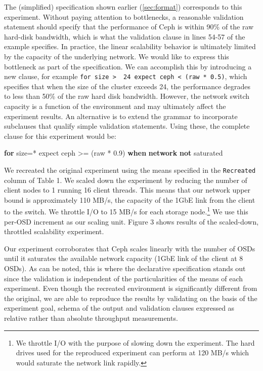 \documentclass[10pt,reprint]{sigplanconf}
\newenvironment{Shaded}{\begin{snugshade}}{\end{snugshade}}
\newcommand{\KeywordTok}[1]{\textcolor[rgb]{0.13,0.29,0.53}{\textbf{{#1}}}}
\newcommand{\DataTypeTok}[1]{\textcolor[rgb]{0.13,0.29,0.53}{{#1}}}
\newcommand{\FloatTok}[1]{\textcolor[rgb]{0.00,0.00,0.81}{{#1}}}
\newcommand{\NormalTok}[1]{{#1}}
\renewcommand*{\hyperref}[2][\ar]{\def\ar{#2}#2\autoref{#1}}
\begin{document}
The (simplified) specification shown earlier (\hyperref[sec:format]{})
corresponds to this experiment. Without paying attention to bottlenecks,
a reasonable validation statement should specify that the performance of
Ceph is within 90\% of the raw hard-disk bandwidth, which is what the
validation clause in lines 54-57 of the example specifies. In practice,
the linear scalability behavior is ultimately limited by the capacity of
the underlying network. We would like to express this bottleneck as part
of the specification. We can accomplish this by introducing a new
clause, for example
\texttt{for\ size\ \textgreater{}\ \ 24\ expect\ ceph\ \textless{}\ (raw\ *\ 0.5)},
which specifies that when the size of the cluster exceeds 24, the
performance degrades to less than 50\% of the raw hard disk bandwidth.
However, the network switch capacity is a function of the environment
and may ultimately affect the experiment results. An alternative is to
extend the grammar to incorporate subclauses that qualify simple
validation statements. Using these, the complete clause for this
experiment would be:

\begin{Shaded}
\begin{Highlighting}[]
  \KeywordTok{for}    \NormalTok{size=*}
  \NormalTok{expect ceph >= (}\DataTypeTok{raw} \NormalTok{* }\FloatTok{0.9}\NormalTok{)}
  \KeywordTok{when}   \KeywordTok{network} \KeywordTok{not} \NormalTok{saturated}
\end{Highlighting}
\end{Shaded}

We recreated the original experiment using the means specified in the
\texttt{Recreated} column of Table 1. We scaled down the experiment by
reducing the number of client nodes to 1 running 16 client threads. This
means that our network upper bound is approximately 110 MB/s, the
capacity of the 1GbE link from the client to the switch. We throttle I/O
to 15 MB/s for each storage node.\footnote{We throttle I/O with the
  purpose of slowing down the experiment. The hard drives used for the
  reproduced experiment can perform at 120 MB/s which would saturate the
  network link rapidly.} We use this per-OSD increment as our scaling
unit. Figure 3 shows results of the scaled-down, throttled scalability
experiment.

Our experiment corroborates that Ceph scales linearly with the number of
OSDs until it saturates the available network capacity (1GbE link of the
client at 8 OSDs). As can be noted, this is where the declarative
specification stands out since the validation is independent of the
particularities of the means of each experiment. Even though the
recreated environment is significantly different from the original, we
are able to reproduce the results by validating on the basis of the
experiment goal, schema of the output and validation clauses expressed
as relative rather than absolute throughput measurements.
\end{document}
